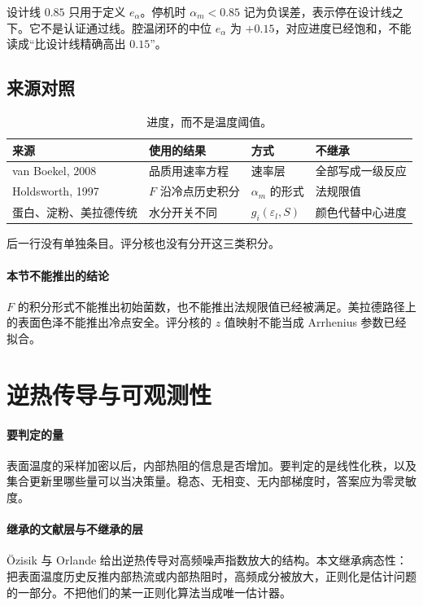 设计线 $0.85$ 只用于定义 $e_\alpha$。停机时 $\alpha_m<0.85$ 记为负误差，表示停在设计线之下。它不是认证通过线。腔温闭环的中位 $e_\alpha$ 为 $+0.15$，对应进度已经饱和，不能读成“比设计线精确高出 $0.15$”。

\subsection{来源对照}
\begin{table}[ht]
\centering
\caption{进度，而不是温度阈值。}
\begin{tabularx}{\textwidth}{lXll}
\toprule
来源 & 使用的结果 & 方式 & 不继承 \\
\midrule
van Boekel, 2008 & 品质用速率方程 & 速率层 & 全部写成一级反应 \\
Holdsworth, 1997 & \(F\) 沿冷点历史积分 & \(\alpha_m\) 的形式 & 法规限值 \\
蛋白、淀粉、美拉德传统 & 水分开关不同 & \(g_i(\varepsilon_l,S)\) & 颜色代替中心进度 \\
\bottomrule
\end{tabularx}
\end{table}
后一行没有单独条目。评分核也没有分开这三类积分。

\paragraph{本节不能推出的结论}
$F$ 的积分形式不能推出初始菌数，也不能推出法规限值已经被满足。美拉德路径上的表面色泽不能推出冷点安全。评分核的 $z$ 值映射不能当成 Arrhenius 参数已经拟合。

\section{逆热传导与可观测性}

\paragraph{要判定的量}
表面温度的采样加密以后，内部热阻的信息是否增加。要判定的是线性化秩，以及集合更新里哪些量可以当决策量。稳态、无相变、无内部梯度时，答案应为零灵敏度。

\paragraph{继承的文献层与不继承的层}
Özisik 与 Orlande 给出逆热传导对高频噪声指数放大的结构\cite{ozisik2000}。本文继承病态性：把表面温度历史反推内部热流或内部热阻时，高频成分被放大，正则化是估计问题的一部分。不把他们的某一正则化算法当成唯一估计器。

